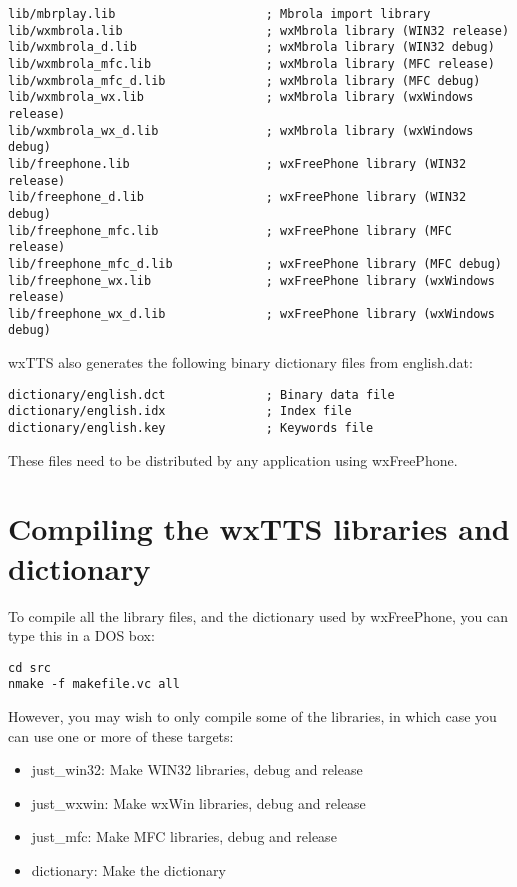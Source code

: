 {\small\begin{verbatim}
lib/mbrplay.lib                     ; Mbrola import library
lib/wxmbrola.lib                    ; wxMbrola library (WIN32 release)
lib/wxmbrola_d.lib                  ; wxMbrola library (WIN32 debug)
lib/wxmbrola_mfc.lib                ; wxMbrola library (MFC release)
lib/wxmbrola_mfc_d.lib              ; wxMbrola library (MFC debug)
lib/wxmbrola_wx.lib                 ; wxMbrola library (wxWindows release)
lib/wxmbrola_wx_d.lib               ; wxMbrola library (wxWindows debug)
lib/freephone.lib                   ; wxFreePhone library (WIN32 release)
lib/freephone_d.lib                 ; wxFreePhone library (WIN32 debug)
lib/freephone_mfc.lib               ; wxFreePhone library (MFC release)
lib/freephone_mfc_d.lib             ; wxFreePhone library (MFC debug)
lib/freephone_wx.lib                ; wxFreePhone library (wxWindows release)
lib/freephone_wx_d.lib              ; wxFreePhone library (wxWindows debug)
\end{verbatim}
}

wxTTS also generates the following binary dictionary files from english.dat:

{\small\begin{verbatim}
dictionary/english.dct              ; Binary data file
dictionary/english.idx              ; Index file
dictionary/english.key              ; Keywords file
\end{verbatim}
}

These files need to be distributed by any application using wxFreePhone.

\section{Compiling the wxTTS libraries and dictionary}

To compile all the library files, and the dictionary used by wxFreePhone, you can
type this in a DOS box:

{\small\begin{verbatim}
cd src
nmake -f makefile.vc all
\end{verbatim}
}

However, you may wish to only compile some of the libraries, in which case you can use
one or more of these targets:

\begin{itemize}\itemsep=0pt
\item just\_win32: Make WIN32 libraries, debug and release
\item just\_wxwin: Make wxWin libraries, debug and release
\item just\_mfc: Make MFC libraries, debug and release
\item dictionary: Make the dictionary
\end{itemize}

